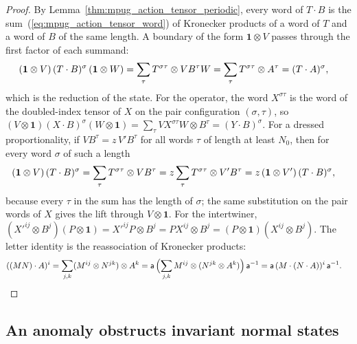 \begin{proof}\leanok
    By Lemma~\ref{thm:mpug_action_tensor_periodic}, every word of
    $T\cdot B$ is the sum~(\ref{eq:mpug_action_tensor_word}) of Kronecker
    products of a word of $T$ and a word of $B$ of the same length. A
    boundary of the form $\mathbf 1\otimes V$ passes through the first
    factor of each summand:
    \begin{align}
        (\mathbf 1\otimes V)\,(T\cdot B)^{\sigma}\,(\mathbf 1\otimes W)
         & =\sum_\tau T^{\sigma\tau}\otimes VB^{\tau}W
        =\sum_\tau T^{\sigma\tau}\otimes A^{\tau}
        =(T\cdot A)^{\sigma},
        \notag
    \end{align}
    which is the reduction of the state. For the operator, the word
    $X^{\sigma\tau}$ is the word of the doubled-index tensor of $X$ on the
    pair configuration $(\sigma,\tau)$, so
    $(V\otimes\mathbf 1)(X\cdot B)^\sigma(W\otimes\mathbf 1)
        =\sum_\tau VX^{\sigma\tau}W\otimes B^\tau
        =(Y\cdot B)^\sigma$. For a dressed proportionality, if
    $VB^{\tau}=z\,V'B^{\tau}$ for all words $\tau$ of length at least $N_0$,
    then for every word $\sigma$ of such a length
    \begin{align}
        (\mathbf 1\otimes V)\,(T\cdot B)^{\sigma}
         & =\sum_\tau T^{\sigma\tau}\otimes VB^{\tau}
        =z\sum_\tau T^{\sigma\tau}\otimes V'B^{\tau}
        =z\,(\mathbf 1\otimes V')\,(T\cdot B)^{\sigma},
        \notag
    \end{align}
    because every $\tau$ in the sum has the length of $\sigma$; the same
    substitution on the pair words of $X$ gives the lift through
    $V\otimes\mathbf 1$. For the intertwiner,
    $(X'^{ij}\otimes B^j)(P\otimes\mathbf 1)=X'^{ij}P\otimes B^j
        =PX^{ij}\otimes B^j=(P\otimes\mathbf 1)(X^{ij}\otimes B^j)$.
    The letter identity is the reassociation of Kronecker products:
    \begin{align}
        ((MN)\cdot A)^i
         & =\sum_{j,k}(M^{ij}\otimes N^{jk})\otimes A^k
        =\mathsf a\,\Bigl(\sum_{j,k}M^{ij}\otimes(N^{jk}\otimes A^k)\Bigr)
        \,\mathsf a^{-1}
        =\mathsf a\,(M\cdot(N\cdot A))^i\,\mathsf a^{-1}.
        \notag
    \end{align}
\end{proof}

\subsection{An anomaly obstructs invariant normal states}

